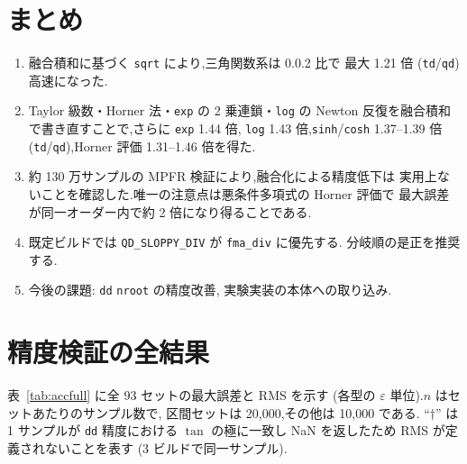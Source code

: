 \documentclass[a4paper,10pt]{ltjsarticle}
\begin{document}
\section{まとめ}

\begin{enumerate}
  \item 融合積和に基づく \texttt{sqrt} により,三角関数系は 0.0.2 比で
        最大 1.21 倍 (\texttt{td}/\texttt{qd}) 高速になった.
  \item Taylor 級数・Horner 法・\texttt{exp} の 2 乗連鎖・\texttt{log} の
        Newton 反復を融合積和で書き直すことで,さらに \texttt{exp} 1.44 倍,
        \texttt{log} 1.43 倍,\texttt{sinh}/\texttt{cosh} 1.37--1.39 倍
        (\texttt{td}/\texttt{qd}),Horner 評価 1.31--1.46 倍を得た.
  \item 約 130 万サンプルの MPFR 検証により,融合化による精度低下は
        実用上ないことを確認した.唯一の注意点は悪条件多項式の Horner 評価で
        最大誤差が同一オーダー内で約 2 倍になり得ることである.
  \item 既定ビルドでは \texttt{QD\_SLOPPY\_DIV} が \texttt{fma\_div} に優先する.
        分岐順の是正を推奨する.
  \item 今後の課題: \texttt{dd} \texttt{nroot} の精度改善,
        実験実装の本体への取り込み.
\end{enumerate}

\appendix

\section{精度検証の全結果}

表~\ref{tab:accfull} に全 93 セットの最大誤差と RMS を示す
(各型の $\varepsilon$ 単位).$n$ はセットあたりのサンプル数で,
区間セットは 20{,}000,その他は 10{,}000 である.
``$\dagger$'' は 1 サンプルが \texttt{dd} 精度における $\tan$ の極に一致し
NaN を返したため RMS が定義されないことを表す (3 ビルドで同一サンプル).
\end{document}
